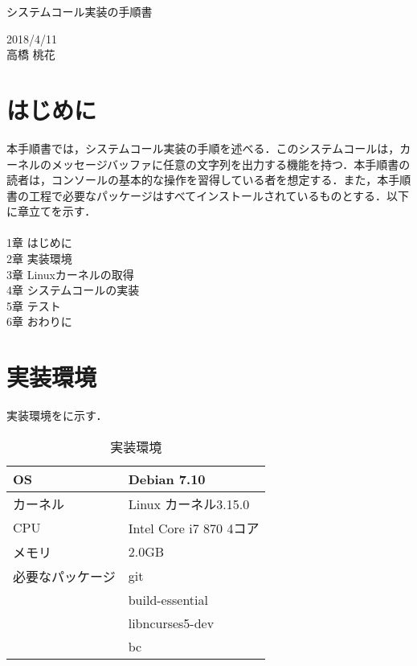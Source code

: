 \documentclass[12pt]{jsarticle}
\begin{document}
\begin{center}
{\LARGE システムコール実装の手順書}
\end{center}

\begin{flushright}
  2018/4/11\\
  高橋 桃花
\end{flushright}
\section{はじめに}
\label{sec:introduction}
本手順書では，システムコール実装の手順を述べる．このシステムコールは，カーネルのメッセージバッファに任意の文字列を出力する機能を持つ．本手順書の読者は，コンソールの基本的な操作を習得している者を想定する．また，本手順書の工程で必要なパッケージはすべてインストールされているものとする．以下に章立てを示す． \\ \\
1章 はじめに \\
2章 実装環境 \\
3章 Linuxカーネルの取得 \\
4章 システムコールの実装 \\
5章 テスト \\
6章 おわりに \\

\section{実装環境}
\label{sec:devenv}
実装環境をに示す．

\begin{table}[h]
  \begin{center}
    \caption{実装環境}\label{tab:devenv_table}
    \begin{tabular}{l|l}
      \hline \hline
      OS & Debian 7.10 \\ \hline
      カーネル & Linux カーネル3.15.0 \\ \hline
      CPU & Intel Core i7 870 4コア\\ \hline
      メモリ & 2.0GB \\ \hline
      必要なパッケージ & git \\ 
      & build-essential \\ 
      & libncurses5-dev \\ 
      & bc \\ \hline
      
    \end{tabular}
  \end{center}
\end{table}
\end{document}
